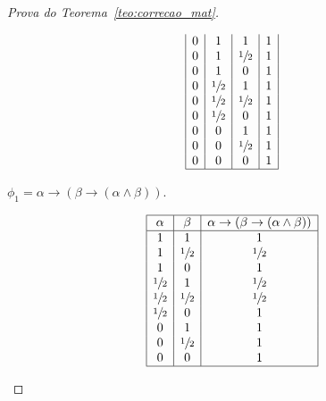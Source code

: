 \begin{proof}[Prova do Teorema~\ref{teo:correcao_mat}]
\begin{provaporcasos}
\begin{provaporsubcasos}
\begin{center}
\[\begin{array}{|c|c|c|c|}
                                0           & 1           & 1           & 1 \\
                                0           & 1           & \meio{} & 1 \\
                                0           & 1           & 0           & 1 \\
                                0           & \meio{} & 1           & 1 \\
                                0           & \meio{} & \meio{} & 1 \\
                                0           & \meio{} & 0           & 1 \\
                                0           & 0           & 1           & 1 \\
                                0           & 0           & \meio{} & 1 \\
                                0           & 0           & 0           & 1 \\
                                \hline%
                            \end{array}
                        \]
                    \end{center}
                

                \subcasodeprova{} $\phi_{1} = \alpha \to (\beta \to (\alpha \land \beta))$. 

                \begin{center}
                    \[
                        \begin{array}{|c|c|c|}%
                            \hline%
                            \alpha      & \beta & \alpha \to (\beta \to (\alpha \land \beta)) \\
                            \hline%
                            1&1&               1\\ 
                            1&\meio{}&\meio{}\\
                            1&0&1\\
                            \meio{}&1&\meio{}\\
                            \meio{}&\meio{}&\meio{}\\
                            \meio{}&0&1\\
                            0&1&1\\
                            0&\meio{}&1\\
                            0&0&1\\
                            \hline%
                        \end{array}
                    \]
                \end{center}


\end{provaporsubcasos}
\end{provaporcasos}
\end{proof}
